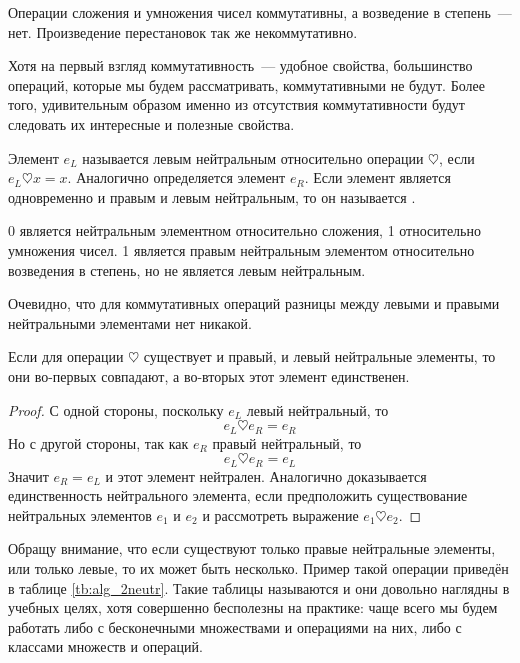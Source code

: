 \begin{example}
Операции сложения и умножения чисел коммутативны, а возведение в степень~--- нет. Произведение перестановок так же некоммутативно.
\end{example}

Хотя на первый взгляд коммутативность~--- удобное свойства, большинство операций, которые мы будем рассматривать, коммутативными не будут. Более того, удивительным образом именно из отсутствия коммутативности будут следовать их интересные и полезные свойства.

\begin{definition}
Элемент $e_L$ называется левым нейтральным относительно операции $\heartsuit$, если $e_L\heartsuit x = x$. Аналогично определяется  элемент $e_R$. Если элемент является одновременно и правым и левым нейтральным, то он называется .
\end{definition}

\begin{example}
0 является нейтральным элементном относительно сложения, 1 относительно умножения чисел. 1 является правым нейтральным элементом относительно возведения в степень, но не является левым нейтральным.
\end{example}

Очевидно, что для коммутативных операций разницы между левыми и правыми нейтральными элементами нет никакой.

\begin{thm}
Если для операции $\heartsuit$ существует и правый, и левый нейтральные элементы, то они во-первых совпадают, а во-вторых этот элемент единственен.
\end{thm}
\begin{proof}
С одной стороны, поскольку $e_L$ левый нейтральный, то
$$e_L\heartsuit e_R = e_R$$
Но с другой стороны, так как $e_R$ правый нейтральный, то
$$e_L\heartsuit e_R = e_L$$
Значит $e_R=e_L$ и этот элемент нейтрален. Аналогично доказывается единственность нейтрального элемента, если предположить существование нейтральных элементов $e_1$ и $e_2$ и рассмотреть выражение $e_1\heartsuit e_2$. 
\end{proof}

Обращу внимание, что если существуют только правые нейтральные элементы, или только левые, то их может быть несколько. Пример такой операции приведён в таблице \ref{tb:alg_2neutr}. Такие таблицы называются  и они довольно наглядны в учебных целях, хотя совершенно бесполезны на практике: чаще всего мы будем работать либо с бесконечными множествами и операциями на них, либо с классами множеств и операций.

